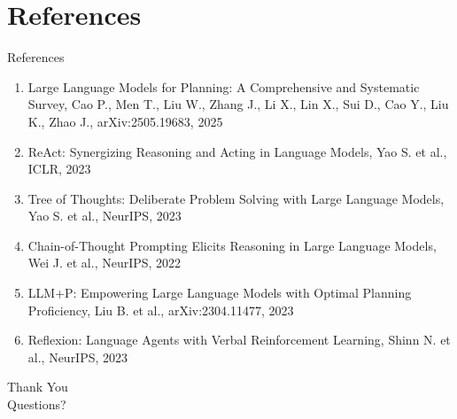 \documentclass[10pt]{beamer}
\begin{document}
\section{References}
\begin{frame}[allowframebreaks]{References}
  \footnotesize
  \begin{enumerate}
    \item Large Language Models for Planning: A Comprehensive and Systematic Survey, Cao P., Men T., Liu W., Zhang J., Li X., Lin X., Sui D., Cao Y., Liu K., Zhao J., arXiv:2505.19683, 2025
    \item ReAct: Synergizing Reasoning and Acting in Language Models, Yao S. et al., ICLR, 2023
    \item Tree of Thoughts: Deliberate Problem Solving with Large Language Models, Yao S. et al., NeurIPS, 2023
    \item Chain-of-Thought Prompting Elicits Reasoning in Large Language Models, Wei J. et al., NeurIPS, 2022
    \item LLM+P: Empowering Large Language Models with Optimal Planning Proficiency, Liu B. et al., arXiv:2304.11477, 2023
    \item Reflexion: Language Agents with Verbal Reinforcement Learning, Shinn N. et al., NeurIPS, 2023
  \end{enumerate}
\end{frame}

\begin{frame}[plain]
  \begin{center}
    {\Huge Thank You}\\[1em]
    {\large Questions?}
  \end{center}
\end{frame}
\end{document}
